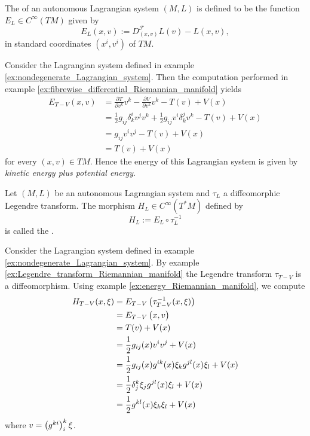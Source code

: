 \begin{definition}[Energy]
	The  of an autonomous Lagrangian system $(M,L)$ is defined to be the function $E_L \in C^\infty(TM)$ given by
	\begin{equation*}
		E_L(x,v) := D^\mathcal{F}_{(x,v)}L(v) - L(x,v),
	\end{equation*}
	\noindent in standard coordinates $(x^i,v^i)$ of $TM$.
\end{definition}

\begin{example}
	\label{ex:energy_Riemannian_manifold}
	Consider the Lagrangian system defined in example \ref{ex:nondegenerate_Lagrangian_system}. Then the computation performed in example \ref{ex:fibrewise_differential_Riemannian_manifold} yields
	\begin{align*}
		E_{T - V}(x,v) &= \frac{\partial T}{\partial v^k}v^k - \frac{\partial V}{\partial v^k}v^k - T(v) + V(x)\\
		&= \frac{1}{2}g_{ij}\delta^i_k v^jv^k + \frac{1}{2}g_{ij}v^i \delta^j_k v^k - T(v) + V(x)\\
		&= g_{ij}v^i v^j - T(v) + V(x)\\
		&= T(v) + V(x)
	\end{align*}
	\noindent for every $(x,v) \in TM$. Hence the energy of this Lagrangian system is given by \emph{kinetic energy plus potential energy}.
\end{example}

\begin{definition}
	Let $(M,L)$ be an autonomous Lagrangian system and $\tau_L$ a diffeomorphic Legendre transform. The morphism $H_L \in C^\infty(T^*M)$ defined by
	\begin{equation*}
		H_L := E_L \circ \tau_L^{-1}
	\end{equation*}
	\noindent is called the .
\end{definition}

\begin{example}
	Consider the Lagrangian system defined in example \ref{ex:nondegenerate_Lagrangian_system}. By example \ref{ex:Legendre_transform_Riemannian_manifold} the Legendre transform $\tau_{T - V}$ is a diffeomorphism. Using example \ref{ex:energy_Riemannian_manifold}, we compute
	\begin{align*}
		H_{T - V}(x,\xi) &= E_{T - V}\del[1]{\tau^{-1}_{T - V}(x,\xi)}\\
		&= E_{T - V}\del[1]{x,v}\\
		&= T(v) + V(x)\\
		&= \frac{1}{2}g_{ij}(x)v^i v^j + V(x)\\
		&= \frac{1}{2}g_{ij}(x)g^{ik}(x)\xi_k g^{jl}(x)\xi_l + V(x)\\
		&= \frac{1}{2}\delta^k_j\xi_j g^{jl}(x)\xi_l + V(x)\\
		&= \frac{1}{2}g^{kl}(x)\xi_k\xi_l + V(x)
	\end{align*}
	\noindent where $v = \del[1]{g^{ki}}^k_i \xi$.
\end{example}

